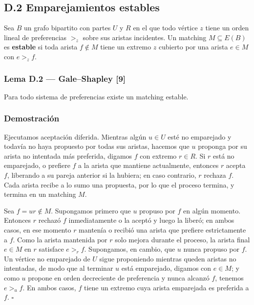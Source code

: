 \documentclass[
  11pt,
]{article}
\begin{document}
\subsection{D.2 Emparejamientos
estables}\label{d.2-emparejamientos-estables}

Sea \(B\) un grafo bipartito con partes \(U\) y \(R\) en el que todo
vértice \(z\) tiene un orden lineal de preferencias \(>_z\) sobre sus
aristas incidentes. Un matching \(M\subseteq E(B)\) es \textbf{estable}
si toda arista \(f\notin M\) tiene un extremo \(z\) cubierto por una
arista \(e\in M\) con \(e>_zf\).

\subsubsection{Lema D.2 --- Gale--Shapley
{[}9{]}}\label{lema-d.2-galeshapley-9}

Para todo sistema de preferencias existe un matching estable.

\subsubsection{Demostración}\label{demostraciuxf3n-8}

Ejecutamos aceptación diferida. Mientras algún \(u\in U\) esté no
emparejado y todavía no haya propuesto por todas sus aristas, hacemos
que \(u\) proponga por su arista no intentada más preferida, digamos
\(f\) con extremo \(r\in R\). Si \(r\) está no emparejado, o prefiere
\(f\) a la arista que mantiene actualmente, entonces \(r\) acepta \(f\),
liberando a su pareja anterior si la hubiera; en caso contrario, \(r\)
rechaza \(f\). Cada arista recibe a lo sumo una propuesta, por lo que el
proceso termina, y termina en un matching \(M\).

Sea \(f=ur\notin M\). Supongamos primero que \(u\) propuso por \(f\) en
algún momento. Entonces \(r\) rechazó \(f\) inmediatamente o la aceptó y
luego la liberó; en ambos casos, en ese momento \(r\) mantenía o recibió
una arista que prefiere estrictamente a \(f\). Como la arista mantenida
por \(r\) solo mejora durante el proceso, la arista final \(e\in M\) en
\(r\) satisface \(e>_rf\). Supongamos, en cambio, que \(u\) nunca
propuso por \(f\). Un vértice no emparejado de \(U\) sigue proponiendo
mientras queden aristas no intentadas, de modo que al terminar \(u\)
está emparejado, digamos con \(e\in M\); y como \(u\) propone en orden
decreciente de preferencia y nunca alcanzó \(f\), tenemos \(e>_uf\). En
ambos casos, \(f\) tiene un extremo cuya arista emparejada es preferida
a \(f\). \(\square\)
\end{document}
